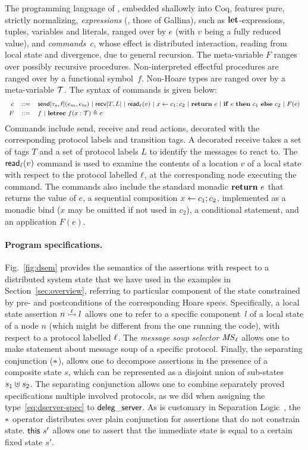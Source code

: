 The programming language of \disel, embedded shallowly into Coq,
features pure, strictly normalizing, \emph{expressions} (\ie, those of
Gallina), such as $\mathsf{{\bf let}}{}$-expressions, tuples, variables and literals,
ranged over by $e$ (with $v$ being a fully reduced value), and
\emph{commands}~$c$, whose effect is distributed interaction, reading
from local state and divergence, due to general recursion. The
meta-variable $F$ ranges over possibly recursive
procedures. Non-interpreted effectful procedures are ranged over by a
functional symbol~$f$. Non-Hoare types are ranged over by a
meta-variable $\mathcal{T}$.
%
The syntax of \disel commands is given below:
%
\[
{\footnotesize
\begin{array}{rcl}
  c & ::= &  \mathsf{send}[\tau_s, \ell](e_m, e_{\mathit{to}}) ~|~ \mathsf{recv}[T, L] ~|~  \mathsf{{read}}{}_{\ell}(v)  ~|~  x \leftarrow c_1; c_2 ~|~ \mathsf{{\bf return}}{}~e ~|~
            \mathsf{{\bf if}}{}~e~\mathsf{{\bf then}}{}~c_1~\mathsf{{\bf else}}{}~c_2 ~|~
            F(e)
  \\[2pt]
  F & ::= & f ~|~ \mathsf{{\bf letrec}}{}~f (x : \mathcal{T}) \triangleq c
\end{array}
}
\]
%
Commands include send, receive and read actions, decorated with the
corresponding protocol labels and transition tags. A decorated receive
takes a set of tags $T$ and a set of protocol labels $L$ to identify
the messages to react to. The $\mathsf{{read}}{}_{\ell}(v)$ command is used to
examine the contents of a location $v$ of a local state with respect
to the protocol labelled $\ell$, at the corresponding node executing
the command.
%
The commands also include the standard monadic $\mathsf{{\bf return}}{}~e$ that returns
the value of $e$, a sequential composition $x \leftarrow c_1; c_2$,
implemented as a monadic bind ($x$ may be omitted if not used in
$c_2$), a conditional statement, and an application $F(e)$.

\paragraph{Program specifications.~}

Fig.~\ref{fig:dsem} provides the semantics of the assertions with
respect to a distributed system state that we have used in the
examples in Section~\ref{sec:overview}, referring to particular
component of the state constrained by pre- and postconditions of the
corresponding Hoare specs.
%
Specifically, a local state assertion $n \ppts{\lab} l$ allows one to
refer to a specific component~$l$ of a local state of a node $n$
(which might be different from the one running the code), with respect
to a protocol labelled $\ell$. The \emph{message soup selector}
$\mathit{MS}_{\ell}$ allows one to make statement about message soup of a
specific protocol. Finally, the separating conjunction ($\ast$),
allows one to decompose assertions in the presence of a composite state
$s$, which can be represented as a disjoint union of sub-states
$s_1 \uplus s_2$.
%
The separating conjunction allows one to combine separately proved
specifications \wrt multiple involved protocols, as we did when
assigning the type~\eqref{eq:dserver-spec} to $\mathsf{deleg\_server}$.
%
As is customary in Separation Logic~\cite{Reynolds:LICS02}, the
$\ast$ operator distributes over plain conjunction for assertions
that do not constrain state.
%
$\mathsf{this}~{s'}$ allows one to assert that the immediate state is equal
to a certain fixed state $s'$.


